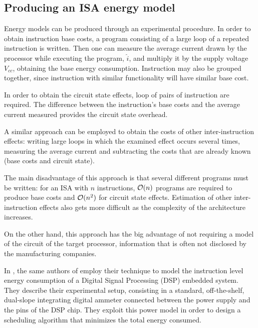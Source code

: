 \subsection{Producing an ISA energy model}
Energy models can be produced through an experimental procedure. \newline
In order to obtain instruction base costs, a program consisting of a large loop of a repeated instruction is written. Then one can measure the average current drawn by the processor while executing the program, $\hat{i}$, and multiply it by the supply voltage $V_{cc}$, obtaining the base energy consumption. \newline
Instruction may also be grouped together, since instruction with similar functionality will have similar base cost.\par 
In order to obtain the circuit state effects, loop of pairs of instruction are required. The difference between the instruction's base costs and the average current measured provides the circuit state overhead. \par 
A similar approach can be employed to obtain the costs of other inter-instruction effects: writing large loops in which the examined effect occurs several times, measuring the average current and subtracting the costs that are already known (base costs and circuit state). \par 
The main disadvantage of this approach is that several different programs must be written: for an ISA with $n$ instructions, $\mathcal{O}(n)$ programs are required to produce base costs and $\mathcal{O}(n^{2})$ for circuit state effects. \newline
Estimation of other inter-instruction effects also gets more difficult as the complexity of the architecture increases. \par
On the other hand, this approach has the big advantage of not requiring a model of the circuit of the target processor, information that is often not disclosed by the manufacturing companies.
\par 
In \cite{tiwari-group}, the same authors of \cite{tiwari} employ their technique to model the instruction level energy consumption of a Digital Signal Processing (DSP) embedded system. They describe their experimental setup, consisting in a standard, off-the-shelf, dual-slope integrating digital ammeter connected between the power supply and the pins of the DSP chip. They exploit this power model in order to design a scheduling algorithm that minimizes the total energy consumed. \par 

